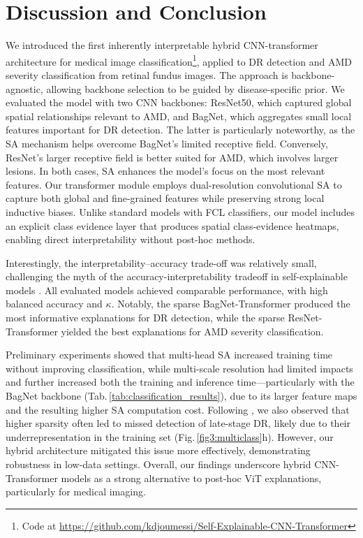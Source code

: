 \documentclass[runningheads]{llncs}
\begin{document}
        
\section{Discussion and Conclusion}
    We introduced the first inherently interpretable hybrid CNN-transformer architecture for medical image classification\footnote{Code at \url{https://github.com/kdjoumessi/Self-Explainable-CNN-Transformer}}, applied to DR detection and AMD severity classification from retinal fundus images. The approach is backbone-agnostic, allowing backbone selection to be guided by disease-specific prior.
    We evaluated the model with two CNN backbones: ResNet50, which captured global spatial relationships relevant to AMD, and BagNet, which aggregates small local features important for DR detection. 
    The latter is particularly noteworthy, as the SA mechanism helps overcome BagNet's limited receptive field. Conversely, ResNet’s larger receptive field is better suited for AMD, which involves larger lesions. In both cases, SA enhances the model's focus on the most relevant features.
    Our transformer module employs dual-resolution convolutional SA to capture both global and fine-grained features while preserving strong local inductive biases.
    Unlike standard models with FCL classifiers, our model includes an explicit class evidence layer that produces spatial class-evidence heatmaps, enabling direct interpretability without post-hoc methods. 

    Interestingly, the interpretability–accuracy trade-off was relatively small, challenging the myth of the accuracy-interpretability tradeoff in self-explainable models \cite{rudin2019stop}. All evaluated models achieved comparable performance, with high balanced accuracy and $\kappa$. Notably, the sparse BagNet-Transformer produced the most informative explanations for DR detection, while the sparse ResNet-Transformer yielded the best explanations for AMD severity classification. 
    
    Preliminary experiments showed that multi-head SA increased training time without improving classification, while multi-scale resolution had limited impacts and further increased both the training and inference time---particularly with the BagNet backbone (Tab.\,\ref{tab:classification_results}), due to its larger feature maps and the resulting higher SA computation cost. 
    Following \cite{donteu2023sparse}, we also observed that higher sparsity often led to missed detection of late-stage DR, likely due to their underrepresentation in the training set (Fig.\,\ref{fig3:multiclass}h). 
    However, our hybrid architecture mitigated this issue more effectively, demonstrating robustness in low-data settings. 
    Overall, our findings underscore hybrid CNN-Transformer models as a strong alternative to post-hoc ViT explanations, particularly for medical imaging.
\end{document}
